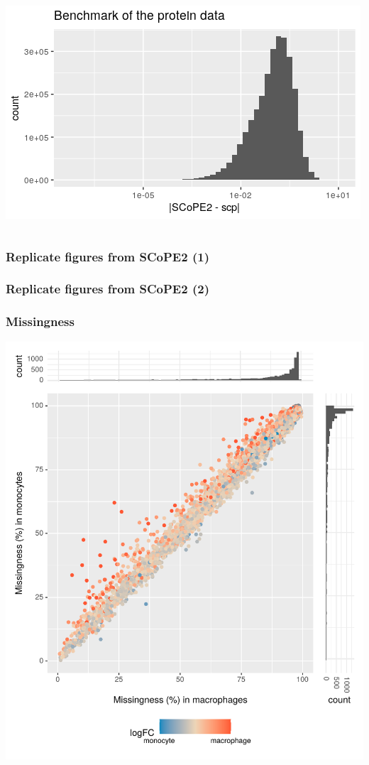 \documentclass{beamer}
\newcommand{\frametitlesection}[1]{\frametitle{\centering #1 \footnotesize \hspace{0pt plus 1 filll} \insertsection}}
\begin{document}
\begin{frame}
\begin{columns}
\begin{column}{0.5\textwidth}
            \includegraphics[width=\linewidth]{figs/Benchmark_prot_err.png}
        \end{column}
    \end{columns}
    
\end{frame}

\begin{frame}
    \frametitlesection{Replicate figures from SCoPE2 (1)}
    
    
\end{frame}

\begin{frame}
    \frametitlesection{Replicate figures from SCoPE2 (2)}
    
\end{frame}

\begin{frame}
    \frametitlesection{Missingness}
    
    \centering
    \includegraphics[width=.7\linewidth]{figs/missingness.pdf}
    
\end{frame}
\end{document}
